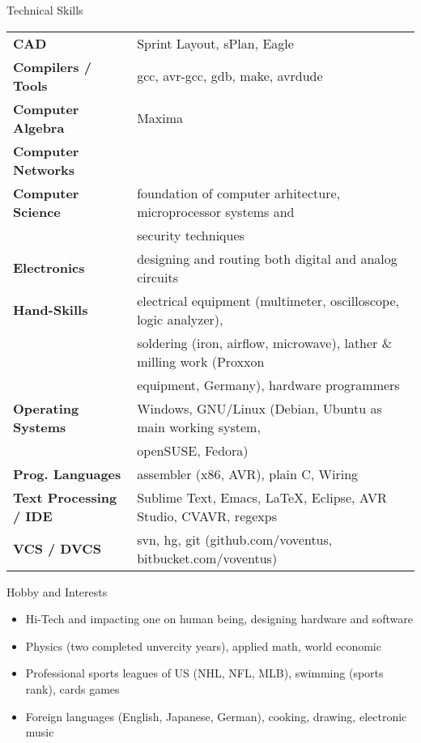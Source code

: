 \documentclass{resume}
\begin{document}
\begin{rSection}{Technical Skills}

\begin{tabular}{ @{} >{\bfseries}l @{\hspace{6ex}} l }
CAD & Sprint Layout, sPlan, Eagle \\
Compilers / Tools & gcc, avr-gcc, gdb, make, avrdude \\
Computer Algebra & Maxima \\
Computer Networks & \\
Computer Science & foundation of computer arhitecture, microprocessor systems and \\
                 & security techniques \\
Electronics & designing and routing both digital and analog circuits\\
Hand-Skills & electrical equipment (multimeter, oscilloscope, logic analyzer), \\
            & soldering (iron, airflow, microwave), lather \& milling work (Proxxon \\
            & equipment, Germany), hardware programmers \\
Operating Systems & Windows, GNU/Linux (Debian, Ubuntu as main working system, \\
            & openSUSE, Fedora) \\
Prog. Languages & assembler (x86, AVR), plain C, Wiring \\
Text Processing / IDE & Sublime Text, Emacs, LaTeX, Eclipse, AVR Studio, CVAVR, regexps \\
VCS / DVCS & svn, hg, git (github.com/voventus, bitbucket.com/voventus)
\end{tabular}

\end{rSection}


\begin{rSection}{Hobby and Interests}

\begin{itemize}
\item Hi-Tech and impacting one on human being, designing hardware and software
\item Physics (two completed unvercity years), applied math, world economic
\item Professional sports leagues of US (NHL, NFL, MLB), swimming (sports rank), cards games
\item Foreign languages (English, Japanese, German), cooking, drawing, electronic music
\end{itemize}

\end{rSection}

\end{document}
